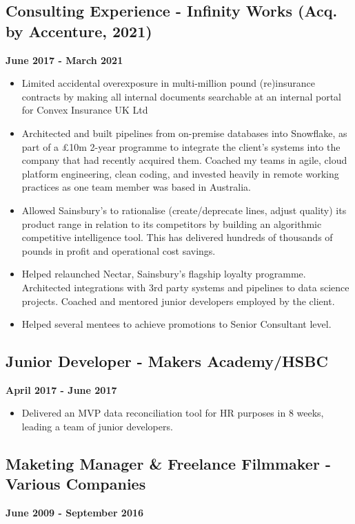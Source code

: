 \documentclass[a4paper]{scrartcl}
\begin{document}
\subsection*{Consulting Experience - Infinity Works (Acq. by Accenture, 2021)}
\textbf{June 2017 - March 2021}
\begin{itemize}
      \item Limited accidental overexposure in multi-million pound
            (re)insurance contracts by making
            all internal documents searchable at an internal portal for Convex
            Insurance UK Ltd
      \item Architected and built pipelines from on-premise databases into
            Snowflake, as part of a £10m 2-year programme to integrate the
            client's systems into the company that had recently acquired them.
            Coached my teams in agile, cloud platform engineering, clean
            coding,
            and invested heavily in remote working practices as one team member
            was based
            in Australia.
      \item Allowed Sainsbury's to rationalise (create/deprecate lines, adjust
            quality) its product range in relation to its competitors by
            building an
            algorithmic competitive intelligence tool. This has delivered
            hundreds of
            thousands of pounds in profit and operational cost savings.
      \item Helped relaunched Nectar, Sainsbury's flagship
            loyalty programme. Architected integrations with 3rd party systems
            and pipelines to data science projects. Coached and mentored junior
            developers
            employed by the client.
      \item Helped several mentees to achieve
            promotions to Senior Consultant level.
\end{itemize}

\subsection*{Junior Developer - Makers Academy/HSBC}
\textbf{April 2017 - June 2017}
\begin{itemize}
      \item Delivered an MVP data reconciliation tool for HR purposes in 8
            weeks, leading a team of junior developers.
\end{itemize}

\subsection*{Maketing Manager \& Freelance Filmmaker - Various Companies}
\textbf{June 2009 - September 2016}
\end{document}
